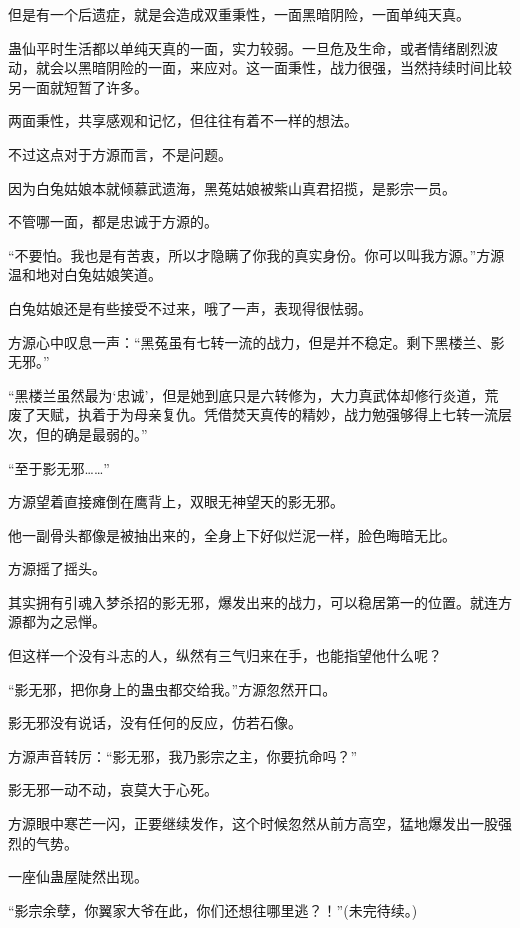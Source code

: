 \begin{this_body}
但是有一个后遗症，就是会造成双重秉性，一面黑暗阴险，一面单纯天真。

蛊仙平时生活都以单纯天真的一面，实力较弱。一旦危及生命，或者情绪剧烈波动，就会以黑暗阴险的一面，来应对。这一面秉性，战力很强，当然持续时间比较另一面就短暂了许多。

两面秉性，共享感观和记忆，但往往有着不一样的想法。

不过这点对于方源而言，不是问题。

因为白兔姑娘本就倾慕武遗海，黑菟姑娘被紫山真君招揽，是影宗一员。

不管哪一面，都是忠诚于方源的。

“不要怕。我也是有苦衷，所以才隐瞒了你我的真实身份。你可以叫我方源。”方源温和地对白兔姑娘笑道。

白兔姑娘还是有些接受不过来，哦了一声，表现得很怯弱。

方源心中叹息一声：“黑菟虽有七转一流的战力，但是并不稳定。剩下黑楼兰、影无邪。”

“黑楼兰虽然最为‘忠诚’，但是她到底只是六转修为，大力真武体却修行炎道，荒废了天赋，执着于为母亲复仇。凭借焚天真传的精妙，战力勉强够得上七转一流层次，但的确是最弱的。”

“至于影无邪……”

方源望着直接瘫倒在鹰背上，双眼无神望天的影无邪。

他一副骨头都像是被抽出来的，全身上下好似烂泥一样，脸色晦暗无比。

方源摇了摇头。

其实拥有引魂入梦杀招的影无邪，爆发出来的战力，可以稳居第一的位置。就连方源都为之忌惮。

但这样一个没有斗志的人，纵然有三气归来在手，也能指望他什么呢？

“影无邪，把你身上的蛊虫都交给我。”方源忽然开口。

影无邪没有说话，没有任何的反应，仿若石像。

方源声音转厉：“影无邪，我乃影宗之主，你要抗命吗？”

影无邪一动不动，哀莫大于心死。

方源眼中寒芒一闪，正要继续发作，这个时候忽然从前方高空，猛地爆发出一股强烈的气势。

一座仙蛊屋陡然出现。

“影宗余孽，你翼家大爷在此，你们还想往哪里逃？！”(未完待续。)

\end{this_body}

